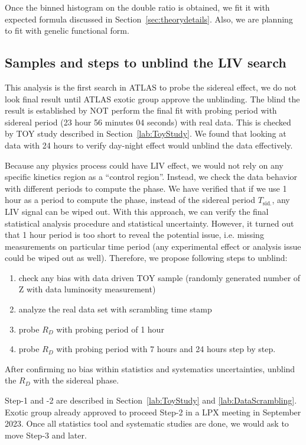 Once the binned histogram on the double ratio is obtained, we fit it with expected formula discussed in Section~\ref{sec:theorydetails}.
Also, we are planning to fit with genelic functional form. 


\subsection{Samples and steps to unblind the LIV search}

 This analysis is the first search in ATLAS to probe the sidereal effect, we do not look final result until ATLAS exotic group approve the unblinding. 
The blind the result is established by NOT perform the final fit with probing period with sidereal period (23 hour 56 minutes 04 seconds) with real data.
This is checked by TOY study described in Section~\ref{lab:ToyStudy}. We found that looking at data with 24 hours to verify day-night effect would unblind the data effectively. 

Because any physics process could have LIV effect, we would not rely on any specific kinetics region as a ``control region''.
Instead, we check the data behavior with different periods to compute the phase.
We have verified that if we use 1 hour as a period to compute the phase, instead of the sidereal
period $T_{\text{sid.}}$, any LIV signal can be wiped out.
With this approach, we can verify the final statistical analysis procedure and statistical uncertainty.
However, it turned out that 1 hour period is too short to reveal the potential issue,
i.e. missing measurements on particular time period (any experimental effect or analysis issue could be wiped out as well).
Therefore, we propose following steps to unblind:

\begin{enumerate}
\item check any bias with data driven TOY sample (randomly generated number of Z with data luminosity measurement)
\item analyze the real data set with scrambling time stamp
\item probe $R_D$ with probing period of 1 hour
\item probe $R_D$ with probing period with 7 hours and 24 hours step by step.
\end{enumerate}
After confirming no bias within statistics and systematics uncertainties, unblind the $R_D$ with the sidereal phase.

Step-1 and -2 are described in Section~\ref{lab:ToyStudy} and \ref{lab:DataScrambling}. 
Exotic group already approved to proceed Step-2 in a LPX meeting in September 2023.
Once all statistics tool and systematic studies are done, we would ask to move Step-3 and later. 

